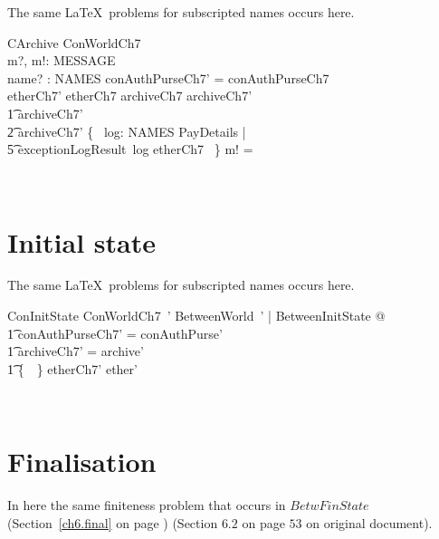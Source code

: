 The same \LaTeX\ problems for subscripted names occurs here.
%
\begin{LSDef}
\begin{schema}{CArchive}
  \Delta ConWorldCh7
  \\      m?, m!: MESSAGE
  \\      name? : NAMES
  \where
  conAuthPurseCh7' = conAuthPurseCh7
  \\      etherCh7' \subseteq etherCh7
  \also
    archiveCh7 \subseteq archiveCh7'
\\ \t1          archiveCh7' \subseteq
  \\ \t2          archiveCh7' \cup \{~ log: NAMES \cross PayDetails |
  \\ \t5                          exceptionLogResult~log \in etherCh7 ~\}
  \also
  m! = \bot
\end{schema}~\end{LSDef}

\section{Initial state}

The same \LaTeX\ problems for subscripted names occurs here.
%
\begin{LSDef}
\begin{schema}{ConInitState}
  ConWorldCh7~'
  \where
  \exists BetweenWorld~' | BetweenInitState @
  \\ \t1          conAuthPurseCh7' = conAuthPurse'
  \\ \t1          \land archiveCh7' = archive'
  \\ \t1          \land \{~\bot~\} \subseteq etherCh7' \subseteq ether'
\end{schema}~\end{LSDef}

\section{Finalisation}

In here the same finiteness problem that occurs in $BetwFinState$
(Section~\ref{ch6.final} on page \pageref{ch6.final}) (Section $6.2$ on page
$53$ on original document).

